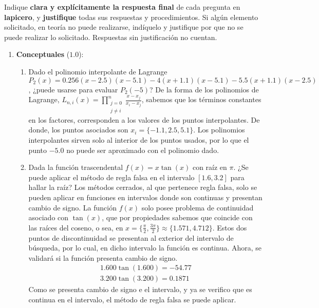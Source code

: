 \documentclass[12pt]{article}
\begin{document}
Indique \textbf{clara y explícitamente la respuesta final} de cada pregunta en \textbf{lapicero}, y \textbf{justifique} todas sus respuestas y procedimientos. Si algún elemento solicitado, en teoría no puede realizarse, indíquelo y justifique por que no se puede realizar lo solicitado. Respuestas sin justificación no cuentan.
  \begin{enumerate}[leftmargin=*,widest=9]
    \item \textbf{Conceptuales} ($1.0$):
    \begin{enumerate}[label=\alph*]
    \item Dado el polinomio interpolante de Lagrange \(P_2(x) = 0.256(x-2.5)(x-5.1) - 4(x+1.1)(x-5.1) - 5.5(x+1.1)(x-2.5) \), ¿puede usarse para evaluar \(P_2(-5)\)?
    De la forma de los polinomios de Lagrange, \( L_{n, i}(x) = \prod\limits_{\substack{j = 0\\ j \neq i}}^n \frac{x- x_j}{x_i - x_j}\), sabemos que los términos constantes en los factores, corresponden a los valores de los puntos interpolantes. De donde, los puntos asociados son \(x_i = \lbrace -1.1, 2.5, 5.1 \rbrace \). Los polinomios interpolantes sirven solo al interior de los puntos usados, por lo que el punto \(-5.0\) no puede ser aproximado con el polinomio dado.
    \item Dada la función trascendental \(f(x) = x\tan(x) \) con raíz en \(\pi \). ¿Se puede aplicar el método de regla falsa en el intervalo \( \left[1.6, 3.2\right] \) para hallar la raíz?
    Los métodos cerrados, al que pertenece regla falsa, solo se pueden aplicar en funciones en intervalos donde son continuas y presentan cambio de signo. La función \(f(x)\) solo posee problema de continuidad asociado con \(\tan(x)\), que por propiedades sabemos que coincide con las raíces del coseno, o sea, en \(x = \lbrace \frac{\pi}{2}, \frac{3\pi}{2} \rbrace \approx \lbrace 1.571, 4.712 \rbrace \). Estos dos puntos de discontinuidad se presentan al exterior del intervalo de búsqueda, por lo cual, en dicho intervalo la función es continua.
    Ahora, se validará si la función presenta cambio de signo.
    \begin{eqnarray*}
    1.600 \tan(1.600) = -54.77 \\
    3.200 \tan(3.200) = 0.1871
    \end{eqnarray*}
    Como se presenta cambio de signo e el intervalo, y ya se verifico que es continua en el intervalo, el método de regla falsa se puede aplicar.

\end{enumerate}
\end{enumerate}
\end{document}
